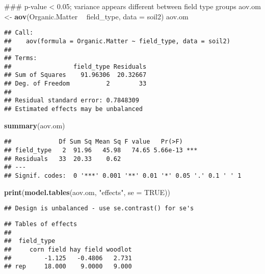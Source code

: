 \documentclass[]{article}
\newenvironment{Shaded}{\begin{snugshade}}{\end{snugshade}}
\newcommand{\KeywordTok}[1]{\textcolor[rgb]{0.13,0.29,0.53}{\textbf{#1}}}
\newcommand{\DataTypeTok}[1]{\textcolor[rgb]{0.13,0.29,0.53}{#1}}
\newcommand{\StringTok}[1]{\textcolor[rgb]{0.31,0.60,0.02}{#1}}
\newcommand{\OtherTok}[1]{\textcolor[rgb]{0.56,0.35,0.01}{#1}}
\newcommand{\OperatorTok}[1]{\textcolor[rgb]{0.81,0.36,0.00}{\textbf{#1}}}
\newcommand{\NormalTok}[1]{#1}
\begin{document}
\begin{Shaded}
\begin{Highlighting}[]
\NormalTok{### p-value < 0.05; variance appears different between field type groups}
\NormalTok{aov.om <-}\StringTok{ }\KeywordTok{aov}\NormalTok{(Organic.Matter }\OperatorTok{~}\StringTok{ }\NormalTok{field_type, }\DataTypeTok{data =}\NormalTok{ soil2)}
\NormalTok{aov.om}
\end{Highlighting}
\end{Shaded}

\begin{verbatim}
## Call:
##    aov(formula = Organic.Matter ~ field_type, data = soil2)
## 
## Terms:
##                 field_type Residuals
## Sum of Squares    91.96306  20.32667
## Deg. of Freedom          2        33
## 
## Residual standard error: 0.7848309
## Estimated effects may be unbalanced
\end{verbatim}

\begin{Shaded}
\begin{Highlighting}[]
\KeywordTok{summary}\NormalTok{(aov.om)}
\end{Highlighting}
\end{Shaded}

\begin{verbatim}
##             Df Sum Sq Mean Sq F value   Pr(>F)    
## field_type   2  91.96   45.98   74.65 5.66e-13 ***
## Residuals   33  20.33    0.62                     
## ---
## Signif. codes:  0 '***' 0.001 '**' 0.01 '*' 0.05 '.' 0.1 ' ' 1
\end{verbatim}

\begin{Shaded}
\begin{Highlighting}[]
\KeywordTok{print}\NormalTok{(}\KeywordTok{model.tables}\NormalTok{(aov.om, }\StringTok{"effects"}\NormalTok{, }\DataTypeTok{se =} \OtherTok{TRUE}\NormalTok{))}
\end{Highlighting}
\end{Shaded}

\begin{verbatim}
## Design is unbalanced - use se.contrast() for se's
\end{verbatim}

\begin{verbatim}
## Tables of effects
## 
##  field_type 
##     corn field hay field woodlot
##         -1.125   -0.4806   2.731
## rep     18.000    9.0000   9.000
\end{verbatim}
\end{document}

